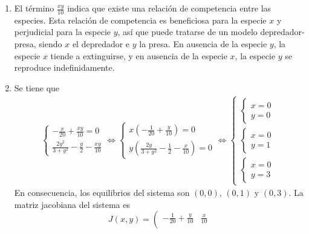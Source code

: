 \documentclass[11pt]{report}
\begin{document}
\begin{solution}
    \hfill
    \begin{enumerate}
        \item El término $\frac{xy}{10}$ indica que existe una relación de competencia entre las especies.  Esta relación de competencia es beneficiosa para la especie $x$ y perjudicial para la especie $y$, así que puede tratarse de un modelo depredador-presa, siendo $x$ el depredador e $y$ la presa. En ausencia de la especie $y$, la especie $x$ tiende a extinguirse, y en ausencia de la especie $x$, la especie $y$ se reproduce indefinidamente.
        \item Se tiene que
        \begin{align*}
            \begin{cases}
                -\frac{x}{20}+\frac{xy}{10} = 0 \\[10pt]
                \frac{2y^2}{3+y^2}-\frac{y}{2}-\frac{xy}{10}
            \end{cases} \iff \begin{cases}
                x(-\frac{1}{20}+\frac{y}{10}) = 0 \\[10pt]
                y(\frac{2y}{3+y^2}-\frac{1}{2}-\frac{x}{10}) = 0
            \end{cases} \iff \begin{cases}
                \begin{cases}
                    x = 0 \\
                    y = 0
                \end{cases} \\[20pt]
                \begin{cases}
                    x = 0 \\
                    y = 1
                \end{cases} \\[20pt]
                \begin{cases}
                    x = 0 \\
                    y = 3
                \end{cases}
            \end{cases}
        \end{align*}
        En consecuencia, los equilibrios del sistema son $(0,0)$, $(0,1)$ y $(0,3)$. La matriz jacobiana del sistema es
        \[J(x,y) = \left(\begin{array}{cc}
            -\frac{1}{20}+\frac{y}{10} & \frac{x}{10} \\[10pt]

\end{array}\]
\end{enumerate}
\end{solution}
\end{document}
